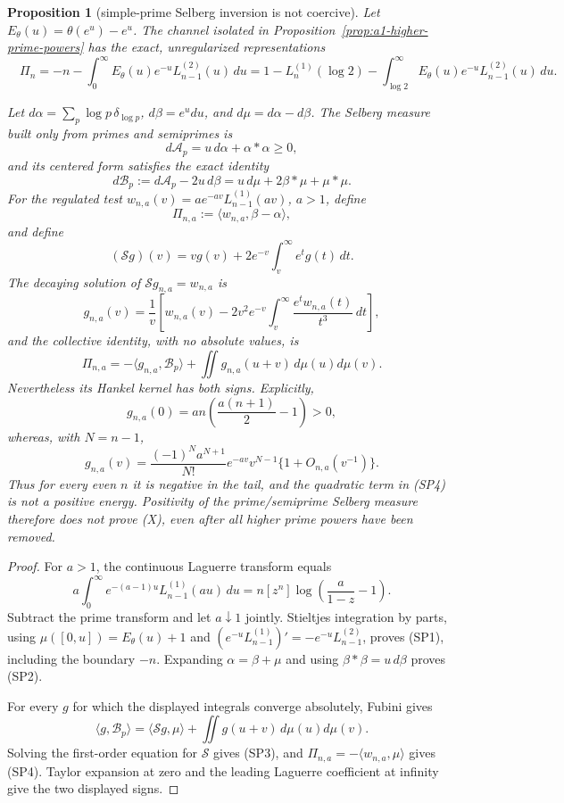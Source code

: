 \documentclass[11pt]{amsart}
\newtheorem{proposition}[theorem]{Proposition}
\theoremstyle{definition}
\theoremstyle{remark}
\theoremstyle{definition}
\begin{document}
\begin{proposition}[simple-prime Selberg inversion is not coercive]
\label{prop:a1-simple-prime-selberg}
Let $E_\theta(u)=\theta(e^u)-e^u$.  The channel isolated in
Proposition~\ref{prop:a1-higher-prime-powers} has the exact, unregularized
representations
\[
 \boxed{\quad
 \Pi_n
 =-n-\int_0^\infty E_\theta(u)e^{-u}L_{n-1}^{(2)}(u)\,du
 =1-L_n^{(1)}(\log2)
  -\int_{\log2}^\infty E_\theta(u)e^{-u}L_{n-1}^{(2)}(u)\,du.
 \quad}                                                       \tag{SP1}
\]

Let $d\alpha=\sum_p\log p\,\delta_{\log p}$,
$d\beta=e^u du$, and $d\mu=d\alpha-d\beta$.  The Selberg measure built
only from primes and semiprimes is
\[
 d\mathcal A_p=u\,d\alpha+\alpha*\alpha\ge0,
\]
and its centered form satisfies the exact identity
\[
 d\mathcal B_p:=d\mathcal A_p-2u\,d\beta
 =u\,d\mu+2\beta*\mu+\mu*\mu.                               \tag{SP2}
\]
For the regulated test
$w_{n,a}(v)=ae^{-av}L_{n-1}^{(1)}(av)$, $a>1$, define
\[
 \Pi_{n,a}:=\langle w_{n,a},\beta-\alpha\rangle,
\]
and define
\[
 (\mathcal Sg)(v)=vg(v)+2e^{-v}\int_v^\infty e^tg(t)\,dt.
\]
The decaying solution of $\mathcal Sg_{n,a}=w_{n,a}$ is
\[
 g_{n,a}(v)=\frac1v\left[w_{n,a}(v)-2v^2e^{-v}
       \int_v^\infty\frac{e^tw_{n,a}(t)}{t^3}\,dt\right],    \tag{SP3}
\]
and the collective identity, with no absolute values, is
\[
 \Pi_{n,a}
 =-\langle g_{n,a},\mathcal B_p\rangle
  +\iint g_{n,a}(u+v)\,d\mu(u)d\mu(v).                       \tag{SP4}
\]
Nevertheless its Hankel kernel has both signs.  Explicitly,
\[
 g_{n,a}(0)=an\left(\frac{a(n+1)}2-1\right)>0,
\]
whereas, with $N=n-1$,
\[
 g_{n,a}(v)=\frac{(-1)^Na^{N+1}}{N!}e^{-av}v^{N-1}
             \{1+O_{n,a}(v^{-1})\}.
\]
Thus for every even $n$ it is negative in the tail, and the quadratic term
in (SP4) is not a positive energy.  Positivity of the prime/semiprime
Selberg measure therefore does not prove (X), even after all higher prime
powers have been removed.
\end{proposition}

\begin{proof}
For $a>1$, the continuous Laguerre transform equals
\[
 a\int_0^\infty e^{-(a-1)u}L_{n-1}^{(1)}(au)\,du
 =n[z^n]\log\left(\frac a{1-z}-1\right).
\]
Subtract the prime transform and let $a\downarrow1$ jointly.  Stieltjes
integration by parts, using
$\mu([0,u])=E_\theta(u)+1$ and
$(e^{-u}L_{n-1}^{(1)})'=-e^{-u}L_{n-1}^{(2)}$, proves (SP1), including
the boundary $-n$.  Expanding $\alpha=\beta+\mu$ and using
$\beta*\beta=u\,d\beta$ proves (SP2).

For every $g$ for which the displayed integrals converge absolutely, Fubini gives
\[
 \langle g,\mathcal B_p\rangle
 =\langle\mathcal Sg,\mu\rangle
  +\iint g(u+v)\,d\mu(u)d\mu(v).
\]
Solving the first-order equation for $\mathcal S$ gives (SP3), and
$\Pi_{n,a}=-\langle w_{n,a},\mu\rangle$ gives (SP4).
Taylor expansion at zero and the leading Laguerre coefficient at infinity
give the two displayed signs.
\end{proof}
\end{document}
